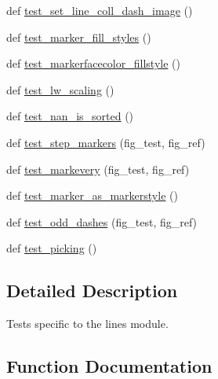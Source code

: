 \begin{DoxyCompactItemize}
\item 
def \hyperlink{namespacematplotlib_1_1tests_1_1test__lines_a26c4d7ad9c3afd0def8bca60f7ae067f}{test\+\_\+set\+\_\+line\+\_\+coll\+\_\+dash\+\_\+image} ()
\item 
def \hyperlink{namespacematplotlib_1_1tests_1_1test__lines_a0b98c8b0b1881f17a1ce1860a816bdd1}{test\+\_\+marker\+\_\+fill\+\_\+styles} ()
\item 
def \hyperlink{namespacematplotlib_1_1tests_1_1test__lines_ab84ce4b5e085fc92cf913efc3db8e92d}{test\+\_\+markerfacecolor\+\_\+fillstyle} ()
\item 
def \hyperlink{namespacematplotlib_1_1tests_1_1test__lines_a8bb977a58a3e636cdefbebd11aca4ce8}{test\+\_\+lw\+\_\+scaling} ()
\item 
def \hyperlink{namespacematplotlib_1_1tests_1_1test__lines_a0905c85df8a24ff5a90f2533e3a62d4f}{test\+\_\+nan\+\_\+is\+\_\+sorted} ()
\item 
def \hyperlink{namespacematplotlib_1_1tests_1_1test__lines_a3b123183ba18e33e862f94e1c068e249}{test\+\_\+step\+\_\+markers} (fig\+\_\+test, fig\+\_\+ref)
\item 
def \hyperlink{namespacematplotlib_1_1tests_1_1test__lines_a30ee555c885ec1fb4ca15e8ddaf05f84}{test\+\_\+markevery} (fig\+\_\+test, fig\+\_\+ref)
\item 
def \hyperlink{namespacematplotlib_1_1tests_1_1test__lines_aabb1e88d2fd9974456f236d44f526ccd}{test\+\_\+marker\+\_\+as\+\_\+markerstyle} ()
\item 
def \hyperlink{namespacematplotlib_1_1tests_1_1test__lines_aec8fa97c3ff3c3dbf74ac6bf55646aa4}{test\+\_\+odd\+\_\+dashes} (fig\+\_\+test, fig\+\_\+ref)
\item 
def \hyperlink{namespacematplotlib_1_1tests_1_1test__lines_a70cac8216a2c59704bdda75cb4cdbd15}{test\+\_\+picking} ()
\end{DoxyCompactItemize}


\subsection{Detailed Description}
\begin{DoxyVerb}Tests specific to the lines module.
\end{DoxyVerb}
 

\subsection{Function Documentation}
\mbox{\label{namespacematplotlib_1_1tests_1_1test__lines_a76207c46df8ba9b99c7e4e91964cf6ff}} 
